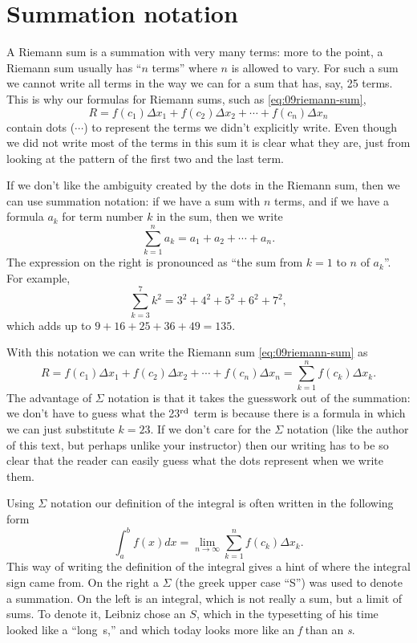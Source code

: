\section{Summation notation} %
\label{sec:09about-those-dots}
A Riemann sum is a summation with very many terms: more to the point, a Riemann
sum usually has ``$n$ terms'' where $n$ is allowed to vary.  For such a sum we
cannot write all terms in the way we can for a sum that has, say, 25 terms.
This is why our formulas for Riemann sums, such as \eqref{eq:09riemann-sum},
\[
  R = f(c_1)\Delta x_1 + f(c_2) \Delta x_2 + \cdots + f(c_n)\Delta x_n
\]
contain dots ($\cdots$) to represent the terms we didn't explicitly write.
Even though we did not write most of the terms in this sum it is clear what they
are, just from looking at the pattern of the first two and the last term.

If we don't like the ambiguity created by the dots in the Riemann sum, then we
can use summation notation: if we have a sum with $n$ terms, and if we
have a formula $a_k$ for term number $k$ in the sum, then we write
\[
  \sum_{k=1}^n a_k = a_1+a_2+\cdots+a_n.
\]
The expression on the right is pronounced as ``the sum from $k=1$ to $n$ of
$a_k$''.  For example,
\[
  \sum_{k=3}^7 k^2 = 3^2 + 4^2 + 5^2 + 6^2 + 7^2,
\]
which adds up to $9+16+25+36+49 = 135$.

With this notation we can write the Riemann sum \eqref{eq:09riemann-sum} as
\[
  R = f(c_1)\Delta x_1 + f(c_2) \Delta x_2 + \cdots + f(c_n)\Delta x_n
  = \sum_{k=1}^n f(c_k) \Delta x_k.
\]
The advantage of $\Sigma$ notation is that it takes the guesswork out of the
summation:  we don't have to guess what the 23$^{\rm rd}$ term is because there
is a formula in which we can just substitute $k=23$.  If we don't care for the
$\Sigma$ notation (like the author of this text, but perhaps unlike your
instructor) then our writing has to be so clear that the reader can easily
guess what the dots represent when we write them.

Using $\Sigma$ notation our definition of the integral is often written in
the following form
\begin{equation}
  \int_a^b f(x) dx
  =
  \lim_{n\to\infty} \sum_{k=1}^n f(c_k) \Delta x_k.
  \label{eq:09integral-def-using-sigma-notation}
\end{equation}
This way of writing the definition of the integral gives a hint of where the
integral sign came from.  On the right a $\Sigma$ (the greek upper case ``S'')
was used to denote a summation.
On the left is an integral, which is not really
a sum, but a limit of sums.  To denote it, Leibniz chose an
$S$, which in the typesetting of his time looked like a ``long~s,'' and which today
looks more like an \textit{f} than an \textit{s}.


